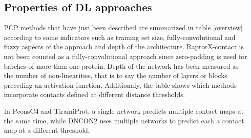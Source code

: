     \subsection{Properties of DL approaches}

        PCP methods that have just been described are summarized in table \ref{overview}
        according to some indicators such as training set size, fully-convolutional and fuzzy
        aspects of the approach and depth of the architecture. RaptorX-contact is not been
        counted as a fully-convolutional approach since zero-padding is used for batches of
        more than one protein. Depth of the network has been measured as the number of non-linearities,
        that is to say the number of layers or blocks preceding an activation function.
        Additionaly, the table shows which methods incorporate contacts defined at different distance
        thresholds.

        \begin{table}[H]
            \centering
            \label{overview}
        \end{table}

        In PconsC4 and TiramiProt, a single network predicts multiple contact maps at the same time, while
        DNCON2 uses multiple networks to predict each a contact map at a different threshold.
